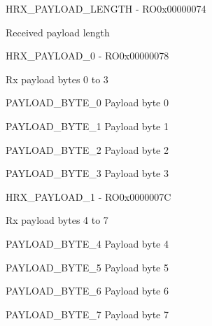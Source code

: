 \documentclass{article}
\begin{document}
\begin{register}{H}{RX{\_}PAYLOAD{\_}LENGTH - RO}{0x00000074}  \par Received payload length \regnewline
  \label{RX_PAYLOAD_LENGTH}
\regnewline
\end{register}

\begin{register}{H}{RX{\_}PAYLOAD{\_}0 - RO}{0x00000078}  \par Rx payload bytes 0 to 3 \regnewline
  \label{RX_PAYLOAD_0}
\regnewline
  \begin{regdesc}\begin{reglist}
    \item [PAYLOAD{\_}BYTE{\_}0] Payload byte 0    \item [PAYLOAD{\_}BYTE{\_}1] Payload byte 1    \item [PAYLOAD{\_}BYTE{\_}2] Payload byte 2    \item [PAYLOAD{\_}BYTE{\_}3] Payload byte 3  \end{reglist}\end{regdesc}
\end{register}

\begin{register}{H}{RX{\_}PAYLOAD{\_}1 - RO}{0x0000007C}  \par Rx payload bytes 4 to 7 \regnewline
  \label{RX_PAYLOAD_1}
\regnewline
  \begin{regdesc}\begin{reglist}
    \item [PAYLOAD{\_}BYTE{\_}4] Payload byte 4    \item [PAYLOAD{\_}BYTE{\_}5] Payload byte 5    \item [PAYLOAD{\_}BYTE{\_}6] Payload byte 6    \item [PAYLOAD{\_}BYTE{\_}7] Payload byte 7  \end{reglist}\end{regdesc}
\end{register}
\end{document}
